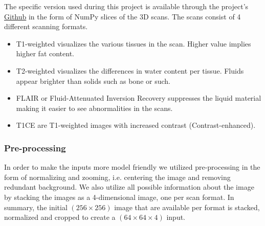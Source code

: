 \documentclass[fleqn,10pt]{SelfArx} %
\begin{document}
The specific version used during this project is available through the project's \href{https://github.com/Tottowich/AppliedDL-project}{Github} in the form of NumPy slices of the 3D scans. The scans consist of 4 different scanning formats.
\begin{itemize}
  \setlength{\itemsep}{5pt}
  \setlength{\parskip}{5pt}
    \item T1-weighted visualizes the various tissues in the scan. Higher value implies higher fat content.
    \item T2-weighted visualizes the differences in water content per tissue. Fluids appear brighter than solids such as bone or such.
    \item FLAIR or Fluid-Attenuated Inversion Recovery suppresses the liquid material making it easier to see abnormalities in the scans.
    \item T1CE are T1-weighted images with increased contrast (Contrast-enhanced).\cite{mri}
\end{itemize}
\subsubsection{Pre-processing}
In order to make the inputs more model friendly we utilized pre-processing in the form of normalizing and zooming, i.e. centering the image and removing redundant background. We also utilize all possible information about the image by stacking the images as a 4-dimensional image, one per scan format. In summary, the initial $(256\times256)$ image that are available per format is stacked, normalized and cropped to create a $(64\times64\times4)$ input. 
\end{document}

